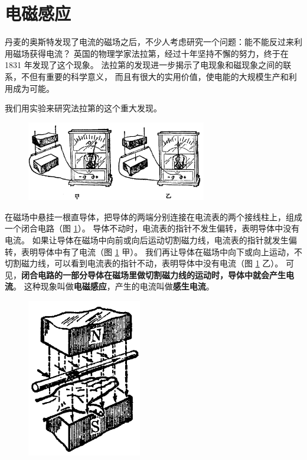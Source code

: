 \section{电磁感应}\label{sec:10-12}

丹麦的奥斯特发现了电流的磁场之后，不少人考虑研究一个问题：能不能反过来利用磁场获得电流？
英国的物理学家法拉第，经过十年坚持不懈的努力，终于在 1831 年发现了这个现象。
法拉第的发现进一步揭示了电现象和磁现象之间的联系，不但有重要的科学意义，
而且有很大的实用价值，使电能的大规模生产和利用成为可能。

我们用实验来研究法拉第的这个重大发现。

\begin{figure}[htbp]
    \centering
    \includegraphics[width=0.7\textwidth]{../pic/czwl2-ch10-45}
    \caption{}\label{fig:10-45}
\end{figure}

在磁场中悬挂一根直导体，把导体的两端分别连接在电流表的两个接线柱上，组成一个闭合电路（图 \ref{fig:10-45}）。
导体不动时，电流表的指针不发生偏转，表明导体中没有电流。
如果让导体在磁场中向前或向后运动切割磁力线，电流表的指针就发生偏转，表明导体中有了电流（图 \ref{fig:10-45} 甲）。
我们再让导体在磁场中向下或向上运动，不切割磁力线，可以看到电流表的指针不动，表明导体中没有电流（图 \ref{fig:10-45} 乙）。
可见，\textbf{闭合电路的一部分导体在磁场里做切割磁力线的运动时，导体中就会产生电流}。
这种现象叫做\textbf{电磁感应}，产生的电流叫做\textbf{感生电流}。

\begin{figure}
    \centering
    \includegraphics[width=5cm]{../pic/czwl2-ch10-46}
    \caption{}\label{fig:10-46}
\end{figure}

